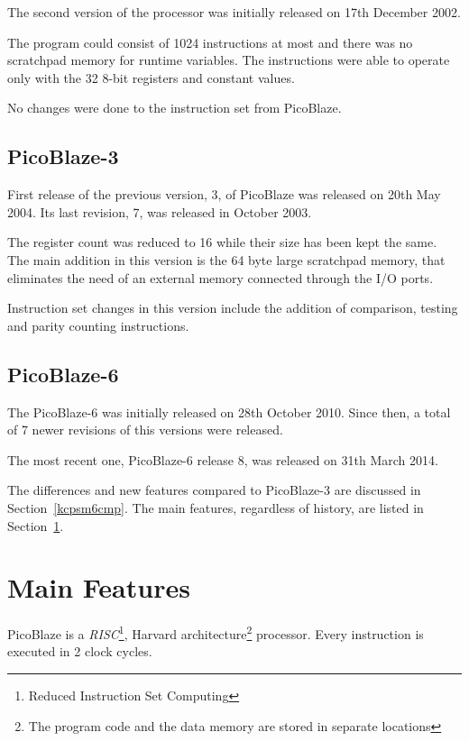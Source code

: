         The second version of the processor was initially released on 17th December 2002.

        The program could consist of 1024 instructions at most and there was no scratchpad memory for runtime variables. The instructions were able to operate only with the 32 8-bit registers and constant values.

        No changes were done to the instruction set from PicoBlaze.\cite{PicoBlaze2}

        \subsection{PicoBlaze-3}

        First release of the previous version, 3, of PicoBlaze was released on 20th May 2004. Its last revision, 7, was released in October 2003.

        The register count was reduced to 16 while their size has been kept the same. The main addition in this version is the 64 byte large scratchpad memory, that eliminates the need of an external memory connected through the I/O ports.

        Instruction set changes in this version include the addition of comparison, testing and parity counting instructions.\cite{PicoBlaze3}

        \subsection{PicoBlaze-6}

        The PicoBlaze-6 was initially released on 28th October 2010. Since then, a total of 7 newer revisions of this versions were released.

        The most recent one, PicoBlaze-6 release 8, was released on 31th March 2014.\cite{PicoBlaze6}

        The differences and new features compared to PicoBlaze-3 are discussed in Section~\ref{kcpsm6cmp}. The main features, regardless of history, are listed in Section~\ref{mainfeatures}.

    \section{Main Features}\label{mainfeatures}

    PicoBlaze is a \emph{RISC}\footnote{Reduced Instruction Set Computing}, Harvard architecture\footnote{The program code and the data memory are stored in separate locations} processor. Every instruction is executed in 2 clock cycles.\cite{PicoBlazeWeb}\cite{PicoBlaze6}


